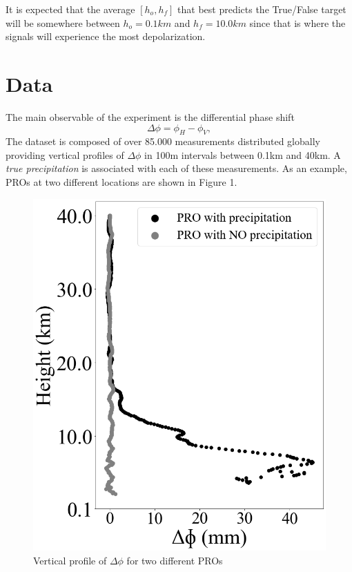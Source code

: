 \documentclass[twocolumn]{revtex4}
\begin{document}
It is expected that the average $[h_o, h_f]$ that best predicts the 
True/False target will be somewhere between $h_o=0.1km$ and $h_f=10.0km$ since that 
is where the signals will experience the most depolarization. 

\section{Data}

The main observable of the experiment is the differential phase shift
\begin{equation}
    \Delta \phi =\phi_H - \phi_V,
\label{eq:1}
\end{equation}
The dataset is composed of over 85.000 measurements distributed globally 
providing vertical profiles of $\Delta\phi$  in 100m intervals between
0.1km and 40km. A {\it true precipitation} is associated with each of 
these measurements. As an example, PROs at two different locations are shown 
in Figure 1. 
\begin{figure}[h!]
\centering
\includegraphics[scale=0.2]{vprofile.png}
\caption{Vertical profile of $\Delta \phi$ for two different PROs}
\label{fig:sample}
\end{figure}
\end{document}
